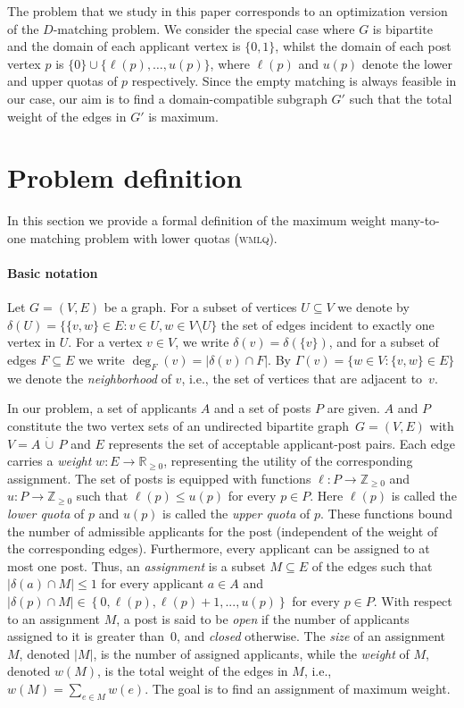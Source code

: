 \documentclass{llncs}
\begin{document}
The problem that we study in this paper corresponds to an optimization version of the $D$-matching problem. We consider the special case where $G$ is bipartite and the domain of each applicant vertex is $\{0,1\}$, whilst the domain of each post vertex $p$ is $\{0\}\cup \{\ell(p),\dots,u(p)\}$, where $\ell(p)$ and $u(p)$ denote the lower and upper quotas of $p$ respectively.  Since the empty matching is always feasible in our case, our aim is to find a domain-compatible subgraph $G'$ such that the total weight of the edges in $G'$ is maximum.

\section{Problem definition}
\label{sec:probdef}
In this section we provide a formal definition of the maximum weight many-to-one matching problem with lower quotas (\textsc{wmlq}).

\paragraph{Basic notation}
Let $G = (V, E)$ be a graph.
For a subset of vertices $U \subseteq V$ we denote by $\delta(U) = \{\{ v, w\} \in E : v \in U, w\in V \setminus U\}$ the set of edges incident to exactly one vertex in $U$. For a vertex $v \in V$, we write $\delta(v) = \delta(\{v\})$, and for a subset of edges $F \subseteq E$ we write $\deg_F(v) = |\delta(v) \cap F|$.
By $\Gamma(v) = \{w \in V : \{v, w\} \in E\}$ we denote the \emph{neighborhood} of $v$, i.e., the set of vertices that are adjacent to~$v$.
\medskip

In our problem, a set of applicants $A$ and a set of posts $P$ are given. $A$ and $P$ constitute the two vertex sets of an undirected bipartite graph~$G = (V, E)$ with $V = A\,\dot\cup\, P$ and $E$ represents the set of acceptable applicant-post pairs. 
Each edge carries a \emph{weight} $w: E \rightarrow \mathbb{R}_{\geq 0}$, representing the utility of the corresponding assignment. The set of posts is equipped with functions $\ell: P \rightarrow \mathbb{Z}_{\geq 0}$ and $u: P \rightarrow \mathbb{Z}_{\geq 0}$ such that $\ell(p) \leq u(p)$ for every $p \in P$.  Here $\ell(p)$ is called the \emph{lower quota} of $p$ and $u(p)$ is called the \emph{upper quota} of $p$.  These functions bound the number of admissible applicants for the post (independent of the weight of the corresponding edges). Furthermore, every applicant can be assigned to at most one post.
Thus, an \emph{assignment} is a subset $M \subseteq E$ of the edges such that $|\delta(a) \cap M| \leq 1$ for every applicant $a \in A$ and $|\delta(p) \cap M| \in \left\{ 0, \ell(p), \ell(p)+1, ..., u(p) \right\}$ for every $p \in P$. With respect to an assignment $M$, a post is said to be \emph{open} if the number of applicants assigned to it is greater than~$0$, and \emph{closed} otherwise. The \emph{size} of an assignment $M$, denoted $|M|$, is the number of assigned applicants, while the \emph{weight} of $M$, denoted $w(M)$, is the total weight of the edges in $M$, i.e., $w(M) = \sum_{e \in M} w(e)$. The goal is to find an assignment of maximum weight.
 
\end{document}
